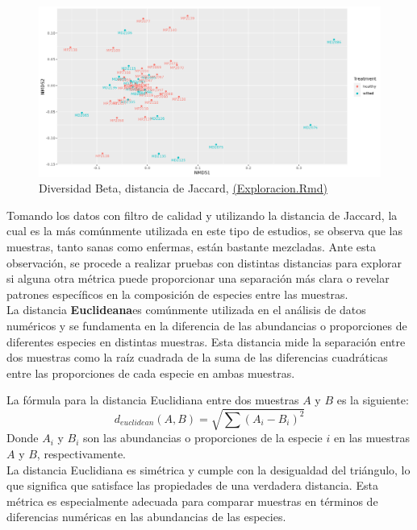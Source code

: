 \begin{figure}[!]
\centering
\includegraphics[width=\textwidth]{Img/cap2/DiversidadBetaFresaKraken_fil_jaccard.png}
\caption{Diversidad Beta, distancia de Jaccard, \href{https://github.com/CamilaSilva1995/Tesis_Maestria/blob/main/Analisis_Comparativo/Fresa_Solena/01_Exploracion.Rmd}{(Exploracion.Rmd)}}
\end{figure}

Tomando los datos con filtro de calidad y utilizando la distancia de Jaccard, la cual es la más comúnmente utilizada en este tipo de estudios, se observa que las muestras, tanto sanas como enfermas, están bastante mezcladas. Ante esta observación, se procede a realizar pruebas con distintas distancias para explorar si alguna otra métrica puede proporcionar una separación más clara o revelar patrones específicos en la composición de especies entre las muestras.\\

La distancia \textbf{Euclideana}es comúnmente utilizada en el análisis de datos numéricos y se fundamenta en la diferencia de las abundancias o proporciones de diferentes especies en distintas muestras. Esta distancia mide la separación entre dos muestras como la raíz cuadrada de la suma de las diferencias cuadráticas entre las proporciones de cada especie en ambas muestras.

La fórmula para la distancia Euclidiana entre dos muestras $A$ y $B$ es la siguiente:
$$d_{euclidean} (A,B) = \sqrt{\sum(A_i - B_i)^2}$$
Donde $A_i$ y $B_i$ son las abundancias o proporciones de la especie $i$ en las muestras $A$ y $B$, respectivamente.\\

La distancia Euclidiana es simétrica y cumple con la desigualdad del triángulo, lo que significa que satisface las propiedades de una verdadera distancia. Esta métrica es especialmente adecuada para comparar muestras en términos de diferencias numéricas en las abundancias de las especies.\\

